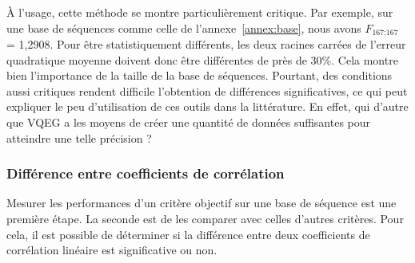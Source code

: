 À l'usage, cette méthode se montre particulièrement critique. Par exemple, sur une base de séquences comme celle de l'annexe~\ref{annex:base}, nous avons $F_{\text{167};\text{167}}$ = 1,2908. Pour être statistiquement différents, les deux racines carrées de l'erreur quadratique moyenne doivent donc être différentes de près de 30\%. Cela montre bien l'importance de la taille de la base de séquences. Pourtant, des conditions aussi critiques rendent difficile l'obtention de différences significatives, ce qui peut expliquer le peu d'utilisation de ces outils dans la littérature. En effet, qui d'autre que VQEG a les moyens de créer une quantité de données suffisantes pour atteindre une telle précision ?


\subsubsection{Différence entre coefficients de corrélation}
Mesurer les performances d'un critère objectif sur une base de séquence est une première étape. La seconde est de les comparer avec celles d'autres critères. Pour cela, il est possible de déterminer si la différence entre deux coefficients de corrélation linéaire est significative ou non.

